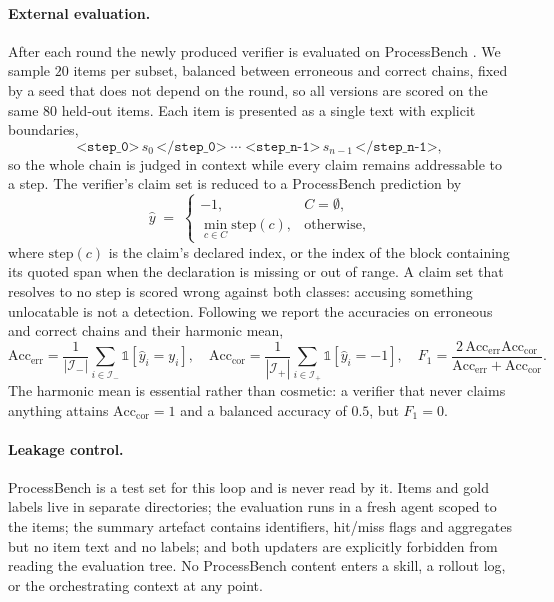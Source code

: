 \documentclass{article} %
\begin{document}
\paragraph{External evaluation.} After each round the newly produced verifier is evaluated
on ProcessBench \citep{zheng2024processbench}. We sample $20$ items per subset, balanced
between erroneous and correct chains, fixed by a seed that does not depend on the round, so
all versions are scored on the same $80$ held-out items. Each item is presented as a single
text with explicit boundaries,
\begin{equation*}
\texttt{<step\_0>}\, s_0 \,\texttt{</step\_0>} \;\cdots\; \texttt{<step\_{n-1}>}\, s_{n-1} \,\texttt{</step\_{n-1}>},
\end{equation*}
so the whole chain is judged in context while every claim remains addressable to a step. The
verifier's claim set is reduced to a ProcessBench prediction by
\begin{equation}
\widehat{y} \;=\;
\begin{cases}
-1, & C = \emptyset,\\
\min_{c \in C} \mathrm{step}(c), & \text{otherwise},
\end{cases}
\label{eq:pred}
\end{equation}
where $\mathrm{step}(c)$ is the claim's declared index, or the index of the block containing
its quoted span when the declaration is missing or out of range. A claim set that resolves
to no step is scored wrong against both classes: accusing something unlocatable is not a
detection. Following \citet{zheng2024processbench} we report the accuracies on erroneous and
correct chains and their harmonic mean,
\begin{equation}
\mathrm{Acc}_{\mathrm{err}} = \frac{1}{|\mathcal{I}_{-}|}\sum_{i \in \mathcal{I}_{-}} \mathbb{1}[\widehat{y}_i = y_i],
\quad
\mathrm{Acc}_{\mathrm{cor}} = \frac{1}{|\mathcal{I}_{+}|}\sum_{i \in \mathcal{I}_{+}} \mathbb{1}[\widehat{y}_i = -1],
\quad
F_1 = \frac{2\,\mathrm{Acc}_{\mathrm{err}}\mathrm{Acc}_{\mathrm{cor}}}{\mathrm{Acc}_{\mathrm{err}} + \mathrm{Acc}_{\mathrm{cor}}}.
\label{eq:pbf1}
\end{equation}
The harmonic mean is essential rather than cosmetic: a verifier that never claims anything
attains $\mathrm{Acc}_{\mathrm{cor}} = 1$ and a balanced accuracy of $0.5$, but $F_1 = 0$.

\paragraph{Leakage control.} ProcessBench is a test set for this loop and is never read by
it. Items and gold labels live in separate directories; the evaluation runs in a fresh agent
scoped to the items; the summary artefact contains identifiers, hit/miss flags and
aggregates but no item text and no labels; and both updaters are explicitly forbidden from
reading the evaluation tree. No ProcessBench content enters a skill, a rollout log, or the
orchestrating context at any point.
\end{document}
